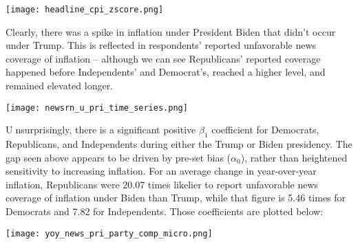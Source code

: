 \documentclass{article}
\begin{document}
\centering \texttt{[image: headline\_cpi\_zscore.png]}

\raggedright Clearly, there was a spike in inflation under President Biden that didn't occur under Trump. This is reflected in respondents' reported unfavorable news coverage of inflation -- although we can see Republicans' reported coverage happened before Independents' and Democrat's, reached a higher level, and remained elevated longer. 

\centering \texttt{[image: newsrn\_u\_pri\_time\_series.png]}

\raggedright Unsurprisingly, there is a significant positive $\beta_1$ coefficient for Democrats, Republicans, and Independents during either the Trump or Biden presidency. The gap seen above appears to be driven by pre-set bias ($\alpha_0$), rather than heightened sensitivity to increasing inflation. For an average change in year-over-year inflation, Republicans were 20.07 times likelier to report unfavorable news coverage of inflation under Biden than Trump, while that figure is 5.46 times for Democrats and 7.82 for Independents. Those coefficients are plotted below:

\centering \texttt{[image: yoy\_news\_pri\_party\_comp\_micro.png]}
\end{document}
